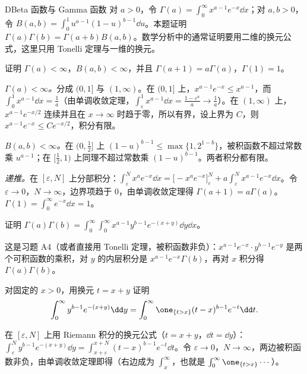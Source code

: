 \thinkingpart

\begin{probleme}[问题]{D}{Beta 函数与 Gamma 函数}
对 $a>0$，令 $\Gamma(a)=\int_0^\infty x^{a-1}e^{-x}\dd x$；对 $a,b>0$，令 $B(a,b)=\int_0^1u^{a-1}(1-u)^{b-1}\dd u$。本题证明 $\Gamma(a)\Gamma(b)=\Gamma(a+b)B(a,b)$。数学分析中的通常证明要用二维的换元公式，这里只用 Tonelli 定理与一维的换元。
\begin{questions}
\item 证明 $\Gamma(a)<\infty$，$B(a,b)<\infty$，并且 $\Gamma(a+1)=a\Gamma(a)$，$\Gamma(1)=1$。
\begin{solution}
\emph{$\Gamma(a)<\infty$。}分成 $(0,1]$ 与 $(1,\infty)$。在 $(0,1]$ 上，$x^{a-1}e^{-x}\leqslant x^{a-1}$，而 $\int_0^1x^{a-1}\dd x=\frac1a$（由单调收敛定理，$\int_\varepsilon^1x^{a-1}\dd x=\frac{1-\varepsilon^a}a\to\frac1a$）。在 $(1,\infty)$ 上，$x^{a-1}e^{-x/2}$ 连续并且在 $x\to\infty$ 时趋于零，所以有界，设上界为 $C$，则 $x^{a-1}e^{-x}\leqslant Ce^{-x/2}$，积分有限。

\emph{$B(a,b)<\infty$。}在 $(0,\frac12]$ 上 $(1-u)^{b-1}\leqslant\max\{1,2^{1-b}\}$，被积函数不超过常数乘 $u^{a-1}$；在 $[\frac12,1)$ 上同理不超过常数乘 $(1-u)^{b-1}$。两者积分都有限。

\emph{递推。}在 $[\varepsilon,N]$ 上分部积分：$\int_\varepsilon^Nx^ae^{-x}\dd x=\bigl[-x^ae^{-x}\bigr]_\varepsilon^N+a\int_\varepsilon^Nx^{a-1}e^{-x}\dd x$。令 $\varepsilon\to0$，$N\to\infty$，边界项趋于 $0$，由单调收敛定理得 $\Gamma(a+1)=a\Gamma(a)$。$\Gamma(1)=\int_0^\infty e^{-x}\dd x=1$。
\end{solution}

\item 证明 $\Gamma(a)\Gamma(b)=\int_0^\infty\int_0^\infty x^{a-1}y^{b-1}e^{-(x+y)}\dd y\dd x$。
\begin{solution}
这是习题 A4（或者直接用 Tonelli 定理，被积函数非负）：$x^{a-1}e^{-x}\cdot y^{b-1}e^{-y}$ 是两个可积函数的乘积，对 $y$ 的内层积分是 $x^{a-1}e^{-x}\Gamma(b)$，再对 $x$ 积分得 $\Gamma(a)\Gamma(b)$。
\end{solution}

\item 对固定的 $x>0$，用换元 $t=x+y$ 证明
\[
\int_0^\infty y^{b-1}e^{-(x+y)}\dd y=\int_0^\infty\one_{\{t>x\}}(t-x)^{b-1}e^{-t}\dd t .
\]
\begin{solution}
在 $[\varepsilon,N]$ 上用 Riemann 积分的换元公式（$t=x+y$，$\dd t=\dd y$）：$\int_\varepsilon^Ny^{b-1}e^{-(x+y)}\dd y=\int_{x+\varepsilon}^{x+N}(t-x)^{b-1}e^{-t}\dd t$。令 $\varepsilon\to0$，$N\to\infty$，两边被积函数非负，由单调收敛定理即得（右边成为 $\int_x^\infty$，也就是 $\int_0^\infty\one_{\{t>x\}}\cdots$）。
\end{solution}


\end{questions}
\end{probleme}
